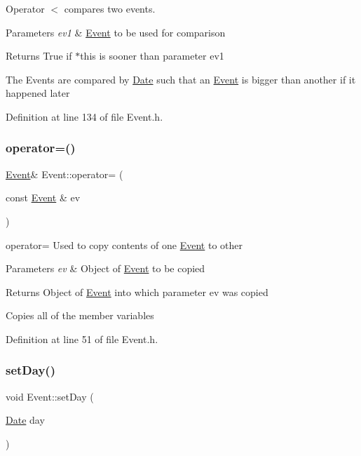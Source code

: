Operator $<$ compares two events. 


\begin{DoxyParams}{Parameters}
{\em ev1} & \hyperlink{class_event}{Event} to be used for comparison \\
\hline
\end{DoxyParams}
\begin{DoxyReturn}{Returns}
True if $\ast$this is sooner than parameter ev1
\end{DoxyReturn}
The Events are compared by \hyperlink{class_date}{Date} such that an \hyperlink{class_event}{Event} is bigger than another if it happened later 

Definition at line 134 of file Event.\+h.

\hypertarget{class_event_a8115e592203a26166924dcae5b064e06}{}\label{class_event_a8115e592203a26166924dcae5b064e06} 
\subsubsection{\texorpdfstring{operator=()}{operator=()}}
{\footnotesize\ttfamily \hyperlink{class_event}{Event}\& Event\+::operator= (\begin{DoxyParamCaption}\item[{const \hyperlink{class_event}{Event} \&}]{ev }\end{DoxyParamCaption})\hspace{0.3cm}{\ttfamily [inline]}}



operator= Used to copy contents of one \hyperlink{class_event}{Event} to other 


\begin{DoxyParams}{Parameters}
{\em ev} & Object of \hyperlink{class_event}{Event} to be copied \\
\hline
\end{DoxyParams}
\begin{DoxyReturn}{Returns}
Object of \hyperlink{class_event}{Event} into which parameter ev was copied
\end{DoxyReturn}
Copies all of the member variables 

Definition at line 51 of file Event.\+h.

\hypertarget{class_event_a7e9fa73e721c69bdf05b894ec3178e9b}{}\label{class_event_a7e9fa73e721c69bdf05b894ec3178e9b} 
\subsubsection{\texorpdfstring{set\+Day()}{setDay()}}
{\footnotesize\ttfamily void Event\+::set\+Day (\begin{DoxyParamCaption}\item[{\hyperlink{class_date}{Date}}]{day }\end{DoxyParamCaption})\hspace{0.3cm}{\ttfamily [inline]}}



